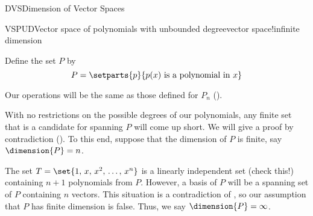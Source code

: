 \begin{subsect}{DVS}{Dimension of Vector Spaces}
\begin{example}{VSPUD}{Vector space of polynomials with unbounded degree}{vector space!infinite dimension}
\begin{para}Define the set $P$ by
%
\begin{equation*}
P=\setparts{p}{p(x)\text{ is a polynomial in }x}
\end{equation*}\end{para}
%
\begin{para}Our operations will be the same as those defined for $P_n$ ().\end{para}
%
\begin{para}With no restrictions on the possible degrees of our polynomials, any finite set that is a candidate for spanning $P$ will come up short.  We will give a proof by contradiction ().  To this end, suppose that the dimension of $P$ is finite, say $\dimension{P}=n$.\end{para}
%
\begin{para}The set $T=\set{1,\,x,\,x^2,\,\ldots,\,x^n}$ is a linearly independent set (check this!) containing $n+1$ polynomials from $P$.  However, a basis of $P$ will be a spanning set of $P$ containing $n$ vectors.  This situation is a contradiction of , so our assumption that $P$ has finite dimension is false.  Thus, we say $\dimension{P}=\infty$.\end{para}
\end{example}
%
%
\end{subsect}
%
